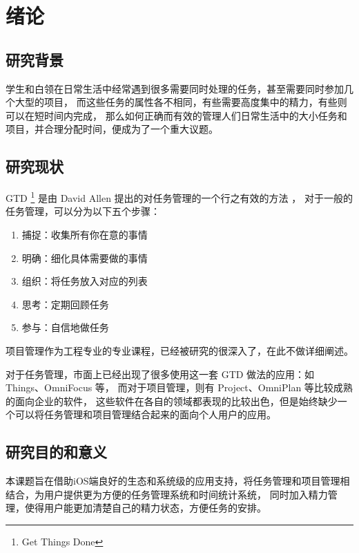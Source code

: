 
\chapter{绪论}
\label{chap:intro}

\section{研究背景}

学生和白领在日常生活中经常遇到很多需要同时处理的任务，甚至需要同时参加几个大型的项目，
而这些任务的属性各不相同，有些需要高度集中的精力，有些则可以在短时间内完成，
那么如何正确而有效的管理人们日常生活中的大小任务和项目，并合理分配时间，便成为了一个重大议题。

\section{研究现状}
GTD \footnote{Get Things Done} 是由 David Allen 提出的对任务管理的一个行之有效的方法 \parencite{allen2015getting} ，
对于一般的任务管理，可以分为以下五个步骤：
\begin{enumerate}
	\item 捕捉：收集所有你在意的事情
	\item 明确：细化具体需要做的事情
	\item 组织：将任务放入对应的列表
	\item 思考：定期回顾任务
	\item 参与：自信地做任务
\end{enumerate}

项目管理作为工程专业的专业课程，已经被研究的很深入了，在此不做详细阐述。

对于任务管理，市面上已经出现了很多使用这一套 GTD 做法的应用：如 Things、OmniFocus 等，
而对于项目管理，则有 Project、OmniPlan 等比较成熟的面向企业的软件，
这些软件在各自的领域都表现的比较出色，但是始终缺少一个可以将任务管理和项目管理结合起来的面向个人用户的应用\parencite{alvarez2019time}。

\section{研究目的和意义}
本课题旨在借助iOS端良好的生态和系统级的应用支持，将任务管理和项目管理相结合，为用户提供更为方便的任务管理系统和时间统计系统\parencite{hollemans2017ios}，
同时加入精力管理，使得用户能更加清楚自己的精力状态，方便任务的安排\parencite{loehr2005power}。

